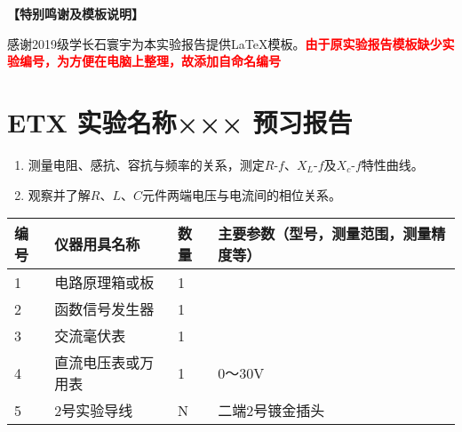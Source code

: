 \documentclass[dvipsnames, svgnames,a4paper,11pt]{article}
\begin{document}
	
	\textbf{【特别鸣谢及模板说明】}	
	
	感谢2019级学长石寰宇为本实验报告提供\LaTeX 模板。\textcolor{red}{\textbf{由于原实验报告模板缺少实验编号，为方便在电脑上整理，故添加自命名编号}}
	
	
	
	\clearpage
	\tableofcontents
	\clearpage
	
	
	
	
	\setcounter{section}{0}
	\section{ETX 实验名称××× \quad\heiti 预习报告}
	
	\begin{enumerate}
		\item 测量电阻、感抗、容抗与频率的关系，测定$R$-$f$、$X_L$-$f$及$X_c$-$f$特性曲线。
		\item 观察并了解$R$、$L$、$C$元件两端电压与电流间的相位关系。
		
	\end{enumerate}
	
	\begin{table}[htbp]
		\centering
		\renewcommand\arraystretch{1.6}
		\begin{tabular}{p{}|p{}|p{}|p{}}
			\hline
			编号& 仪器用具名称 & 数量 &  主要参数（型号，测量范围，测量精度等） \\
			\hline
			1&  电路原理箱或板& 1 &  \\
			\hline
			2&  函数信号发生器& 1 &  \\
			\hline
			3&  交流毫伏表& 1 &  \\
			\hline
			4&  直流电压表或万用表& 1 & 0～30V \\
			\hline
			5&  2号实验导线& N & 二端2号镀金插头 \\
			\hline
		\end{tabular}
	\end{table}
	
\end{document}

